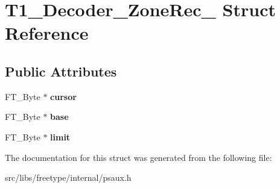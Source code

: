 \hypertarget{struct_t1___decoder___zone_rec__}{
\section{T1\_\-Decoder\_\-ZoneRec\_\- Struct Reference}
\label{struct_t1___decoder___zone_rec__}
}
\subsection*{Public Attributes}
\begin{DoxyCompactItemize}
\item 
\hypertarget{struct_t1___decoder___zone_rec___a14e9f190496672f6174ead91e375767d}{
FT\_\-Byte $\ast$ {\bfseries cursor}}
\label{struct_t1___decoder___zone_rec___a14e9f190496672f6174ead91e375767d}

\item 
\hypertarget{struct_t1___decoder___zone_rec___a9cd7e54387b238504b1e8aae47b7da7c}{
FT\_\-Byte $\ast$ {\bfseries base}}
\label{struct_t1___decoder___zone_rec___a9cd7e54387b238504b1e8aae47b7da7c}

\item 
\hypertarget{struct_t1___decoder___zone_rec___a46fe1e4aa9bdb712ae414305f88d95db}{
FT\_\-Byte $\ast$ {\bfseries limit}}
\label{struct_t1___decoder___zone_rec___a46fe1e4aa9bdb712ae414305f88d95db}

\end{DoxyCompactItemize}


The documentation for this struct was generated from the following file:\begin{DoxyCompactItemize}
\item 
src/libs/freetype/internal/psaux.h\end{DoxyCompactItemize}
